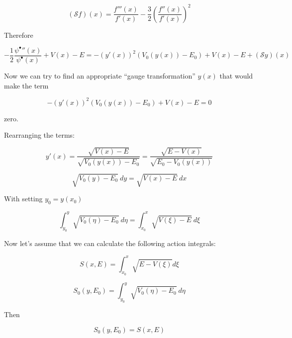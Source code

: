 \documentclass{article}
\theoremstyle{definition}
\begin{document}
\begin{equation}
    (\mathcal{S} f)(x) = \frac{f'''(x)}{f'(x)} - \frac{3}{2} \left ( \frac{f''(x)}{f'(x)}\right )^2
\end{equation}

Therefore

\begin{equation}
    -\frac{1}{2}
    \frac{{\psi^\bullet}''(x)}{\psi^\bullet(x)}
    +
    V(x)-E
    =
    -(y'(x))^2 (V_0(y(x)) - E_0)
    +
    V(x)
    -
    E
    +
    (\mathcal{S} y)(x)
\end{equation}

Now we can try to find an appropriate ``gauge transformation'' $y(x)$ that would make the term 

\begin{equation}
    -(y'(x))^2 (V_0(y(x)) - E_0)
    +
    V(x)
    -
    E
    =
    0
\end{equation}

zero.

Rearranging the terms:

\begin{equation}
    y'(x)
    =
    \frac{\sqrt{V(x)-E}}{\sqrt{V_0(y(x))-E_0}}
    =
    \frac{\sqrt{E-V(x)}}{\sqrt{E_0-V_0(y(x))}}
\end{equation}

\begin{equation}
    \sqrt{V_0(y)-E_0} \ dy
    =
    \sqrt{V(x)-E} \ dx
\end{equation}

With setting $y_0=y(x_0)$

\begin{equation}
    \int_{y_0}^y\sqrt{V_0(\eta)-E_0} \ d\eta
    =
    \int_{x_0}^x\sqrt{V(\xi)-E} \ d\xi
\end{equation}


Now let's assume that we can calculate the following action integrals:

\begin{equation}
    S(x,E)=\int_{x_0}^x \sqrt{E-V(\xi)} d\xi
\end{equation}

\begin{equation}
    S_0(y,E_0)=\int_{y_0}^y\sqrt{V_0(\eta)-E_0} \ d\eta
\end{equation}

Then

\begin{equation}
    S_0(y,E_0) = S(x,E)
\end{equation}
\end{document}
